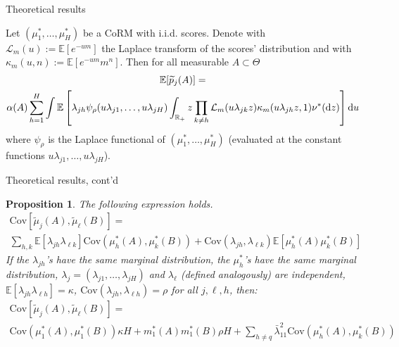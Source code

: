 \documentclass[10.5pt, aspectratio=169]{beamer} %
\newcommand{\E}{\mathbb{E}}
\newcommand{\ptilde}{\widetilde{p}}
\newcommand{\mutilde}{\widetilde{\mu}}
\newcommand{\dd}{\mathrm d}
\newcommand{\Cov}{\mathrm{Cov}}
\newtheorem{proposition}{Proposition}
\begin{document}
\addtocounter{framenumber}{-7}

\appendix

\begin{frame}{Theoretical results}

\begin{theorem}\label{teo:expectation}
    Let $(\mu^*_1, \ldots, \mu^*_H)$ be a CoRM with i.i.d. scores. Denote with $\mathcal{L}_m(u) := \E[e^{-u m}]$ the Laplace transform of the scores' distribution and with $\kappa_m(u, n) := \E[e^{-u m} m^n]$.
    Then for all measurable $A \subset \Theta$
    \begin{multline*}
        \E[\ptilde_j(A)] = \\ \alpha(A) \sum_{h=1}^H \int \E\left[ \lambda_{jh}  \psi_{\rho}(u\lambda_{j1}, \ldots, u \lambda_{jH}) \int_{\R_+} z \prod_{k \neq h} \mathcal{L}_m(u \lambda_{jk} z) \kappa_m(u \lambda_{jh} z, 1) \nu^*(\dd z) \right] \dd u 
    \end{multline*}
    where $\psi_{\rho}$ is the Laplace functional of $(\mu^*_1, \ldots, \mu^*_H)$ (evaluated at the constant functions $u\lambda_{j1}, \ldots, u \lambda_{jH}$).
  \end{theorem}
\end{frame}


\begin{frame}{Theoretical results, cont'd}


\begin{proposition}
The following expression holds.
    \begin{multline*}
        \Cov\left[\mutilde_j(A), \mutilde_\ell(B)\right]  =  \\ \sum_{h, k} \E[\lambda_{jh} \lambda_{\ell k}] \Cov (\mu^*_h(A), \mu^*_k(B)) + \Cov(\lambda_{jh}, \lambda_{\ell k}) \E[\mu^*_h(A) \mu^*_k(B)] 
    \end{multline*}
    If the $\lambda_{jh}$'s have the same marginal distribution, the $\mu^*_h$'s have the same marginal distribution, $\lambda_j = (\lambda_{j1}, \ldots, \lambda_{jH})$ and $\lambda_\ell$ (defined analogously) are independent, $\E[\lambda_{jh} \lambda_{\ell h}] = \kappa$,  $\Cov(\lambda_{jh}, \lambda_{\ell h}) = \rho$ for all $j, \ell, h$, then:
    \begin{multline*}
	\Cov\left[\mutilde_j(A), \mutilde_\ell(B)\right]  =  \\ \Cov(\mu^*_1(A), \mu^*_1(B)) \kappa H + m^*_1(A) m^*_1(B) \rho H + \sum_{h \neq q} \bar \lambda_{11}^2  \Cov(\mu^*_h(A), \mu^*_k(B))
\end{multline*}
%
\end{proposition}
\end{frame}
\end{document}
